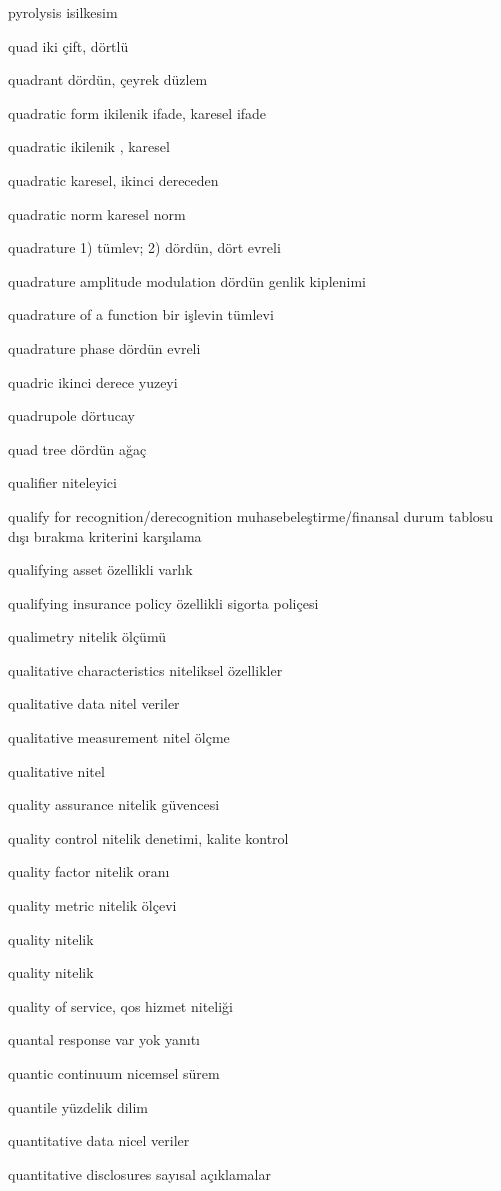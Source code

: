 \documentclass[12pt,fleqn]{article}\usepackage{../../common}
\begin{document}
pyrolysis isilkesim

quad iki çift, dörtlü

quadrant dördün, çeyrek düzlem

quadratic form ikilenik ifade, karesel ifade

quadratic ikilenik , karesel

quadratic karesel, ikinci dereceden

quadratic norm karesel norm

quadrature 1) tümlev; 2) dördün, dört evreli

quadrature amplitude modulation dördün genlik kiplenimi

quadrature of a function bir işlevin tümlevi

quadrature phase dördün evreli

quadric ikinci derece yuzeyi

quadrupole dörtucay

quad tree dördün ağaç

qualifier niteleyici

qualify for recognition/derecognition muhasebeleştirme/finansal durum tablosu dışı bırakma kriterini karşılama

qualifying asset özellikli varlık

qualifying insurance policy özellikli sigorta poliçesi

qualimetry nitelik ölçümü

qualitative characteristics niteliksel özellikler

qualitative data nitel veriler

qualitative measurement nitel ölçme

qualitative nitel

quality assurance nitelik güvencesi

quality control nitelik denetimi, kalite kontrol

quality factor nitelik oranı

quality metric nitelik ölçevi

quality nitelik

quality nitelik

quality of service, qos hizmet niteliği

quantal response var yok yanıtı

quantic continuum nicemsel sürem

quantile yüzdelik dilim

quantitative data nicel veriler

quantitative disclosures sayısal açıklamalar
\end{document}
